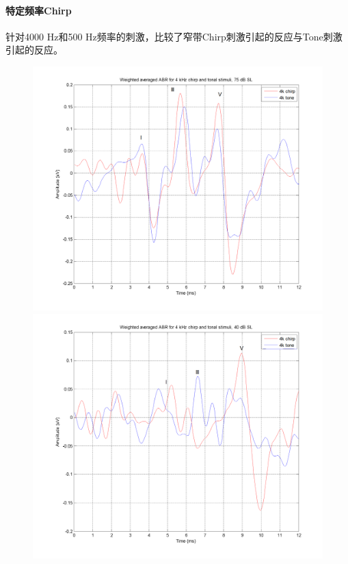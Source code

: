 \paragraph{特定频率Chirp}
针对4000 Hz和500 Hz频率的刺激，比较了窄带Chirp刺激引起的反应与Tone刺激引起的反应。
\begin{figure}[H]
    \centering
    \begin{minipage}{0.48\textwidth}
        \includegraphics[width=\textwidth]{images/4kchirpAndTonalStimuli75db.png}
    \end{minipage}
    \hfill
    \begin{minipage}{0.48\textwidth}
        \includegraphics[width=\textwidth]{images/4kchirpAndTonalStimuli40db.png}
    \end{minipage}
    

\end{figure}
